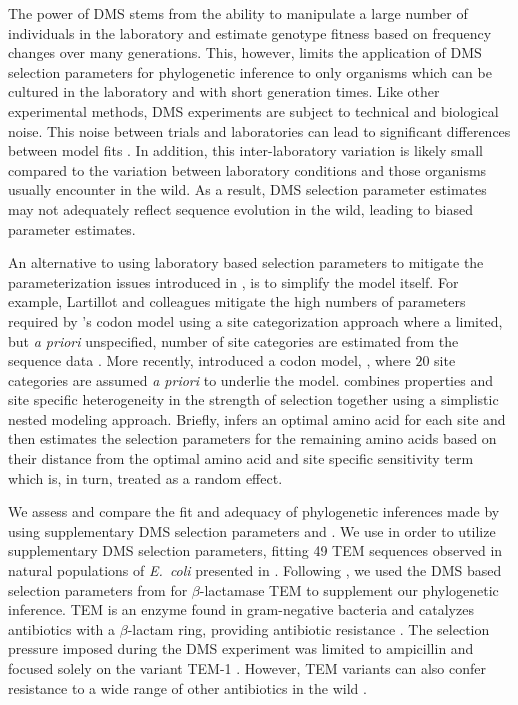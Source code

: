 \documentclass[fleqn,letterpaper]{article}
\begin{document}
The power of DMS stems from the ability to manipulate a large number of individuals in the laboratory and estimate genotype fitness based on frequency changes over many generations.
This, however, limits the application of DMS selection parameters for phylogenetic inference to only organisms which can be cultured in the laboratory and with short generation times.
Like other experimental methods, DMS experiments are subject to technical and biological noise.
This noise between trials and laboratories can lead to significant differences between model fits \citep{hilton2017}.
In addition, this inter-laboratory variation is likely small compared to the variation between laboratory conditions and those organisms usually encounter in the wild.
As a result, DMS selection parameter estimates may not adequately reflect sequence evolution in the wild, leading to biased parameter estimates.

An alternative to using laboratory based selection parameters to mitigate the parameterization issues introduced in \hb, is to simplify the \hb model itself.
For example, Lartillot and colleagues mitigate the high numbers of  parameters required by \hb's codon model using a site categorization approach where a limited, but \emph{a priori} unspecified, number of site categories are estimated from the sequence data \citep{LartillotAndPhilippe2004,le2008,RodrigueEtAl2008,RodrigueAndLartillot2014}.
More recently, \citep{beaulieu2019} introduced a codon model, \selac, where $20$ site categories are assumed \emph{a priori} to underlie the \hb model.
\selac combines \PC properties and site specific heterogeneity in the strength of selection together using a simplistic nested modeling approach.
Briefly, \selac infers an optimal amino acid for each site and then estimates the selection parameters for the remaining amino acids based on their \PC distance from the optimal amino acid and site specific sensitivity term which is, in turn, treated as a random effect.

We assess and compare the fit and adequacy of phylogenetic inferences made by \phydms using supplementary DMS selection parameters and \selac. 
We use \phydms \citep{hilton2017} in order to utilize supplementary DMS selection parameters, fitting 49 TEM sequences observed in natural populations of \emph{E.~coli} presented in \citet{bloom2017}.
Following \citet{bloom2017, hilton2017}, we used the DMS based selection parameters from \citet{stiffler2016} for $\beta$-lactamase TEM to supplement our phylogenetic inference.
TEM is an enzyme found in gram-negative bacteria and catalyzes antibiotics with a $\beta$-lactam ring, providing antibiotic resistance \citep{Neu1969}.
The selection pressure imposed during the DMS experiment was limited to ampicillin and focused solely on the variant TEM-1 \citep{stiffler2016}.
However, TEM variants can also confer resistance to a wide range of other antibiotics in the wild \citep{sougakoff1988,sougakoff1989,goussard1991,mabilat1992,chanal1992,brun1994}.
\end{document}
